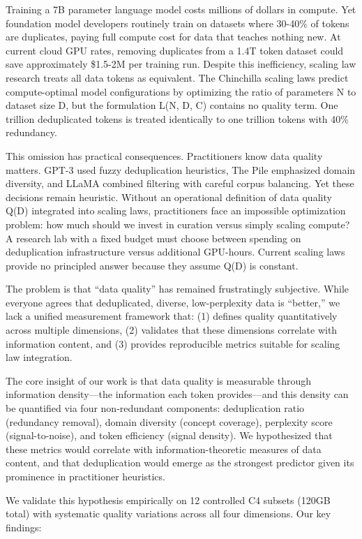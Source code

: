 
Training a 7B parameter language model costs millions of dollars in compute. Yet foundation model developers routinely train on datasets where 30-40\% of tokens are duplicates, paying full compute cost for data that teaches nothing new. At current cloud GPU rates, removing duplicates from a 1.4T token dataset could save approximately \$1.5-2M per training run. Despite this inefficiency, scaling law research treats all data tokens as equivalent. The Chinchilla scaling laws predict compute-optimal model configurations by optimizing the ratio of parameters N to dataset size D, but the formulation L(N, D, C) contains no quality term. One trillion deduplicated tokens is treated identically to one trillion tokens with 40\% redundancy.

This omission has practical consequences. Practitioners know data quality matters. GPT-3 used fuzzy deduplication heuristics, The Pile emphasized domain diversity, and LLaMA combined filtering with careful corpus balancing. Yet these decisions remain heuristic. Without an operational definition of data quality Q(D) integrated into scaling laws, practitioners face an impossible optimization problem: how much should we invest in curation versus simply scaling compute? A research lab with a fixed budget must choose between spending on deduplication infrastructure versus additional GPU-hours. Current scaling laws provide no principled answer because they assume Q(D) is constant.

The problem is that ``data quality'' has remained frustratingly subjective. While everyone agrees that deduplicated, diverse, low-perplexity data is ``better,'' we lack a unified measurement framework that: (1) defines quality quantitatively across multiple dimensions, (2) validates that these dimensions correlate with information content, and (3) provides reproducible metrics suitable for scaling law integration.

The core insight of our work is that data quality is measurable through information density---the information each token provides---and this density can be quantified via four non-redundant components: deduplication ratio (redundancy removal), domain diversity (concept coverage), perplexity score (signal-to-noise), and token efficiency (signal density). We hypothesized that these metrics would correlate with information-theoretic measures of data content, and that deduplication would emerge as the strongest predictor given its prominence in practitioner heuristics.

We validate this hypothesis empirically on 12 controlled C4 subsets (120GB total) with systematic quality variations across all four dimensions. Our key findings:

